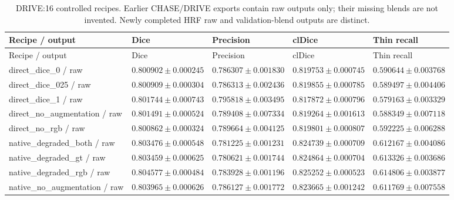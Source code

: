 \documentclass[jimaging,article,submit,pdftex,moreauthors]{Definitions/mdpi}
\begin{document}
\begingroup\scriptsize\setlength{\tabcolsep}{3pt}\renewcommand{\arraystretch}{1.12}\setlength{\LTleft}{-\extralength}\setlength{\LTright}{0pt plus1fill}\setlength{\LTcapwidth}{\dimexpr 15.000cm+24pt\relax}\captionsetup[longtable]{margin=0pt,width=\LTcapwidth,singlelinecheck=false,justification=raggedright}\makeatletter\long{}\makeatother
\begin{longtable}{@{}>{\raggedright\arraybackslash}p{5.0cm}>{\raggedright\arraybackslash}p{2.5cm}>{\raggedright\arraybackslash}p{2.5cm}>{\raggedright\arraybackslash}p{2.5cm}>{\raggedright\arraybackslash}p{2.5cm}@{}}
\caption{DRIVE:16 controlled recipes. Earlier CHASE/DRIVE exports contain raw outputs only; their missing blends are not invented. Newly completed HRF raw and validation-blend outputs are distinct.}\label{tab:controls-DRIVE}\\
\toprule
Recipe / output & Dice & Precision & clDice & Thin recall\\
\midrule\endfirsthead
\toprule
Recipe / output & Dice & Precision & clDice & Thin recall\\
\midrule\endhead
\bottomrule\endfoot
direct\_dice\_0 / raw & $0.800902\pm 0.000245$ & $0.786307\pm 0.001830$ & $0.819753\pm 0.000745$ & $0.590644\pm 0.003768$\\
direct\_dice\_025 / raw & $0.800909\pm 0.000304$ & $0.786313\pm 0.002436$ & $0.819855\pm 0.000785$ & $0.589497\pm 0.004406$\\
direct\_dice\_1 / raw & $0.801744\pm 0.000743$ & $0.795818\pm 0.003495$ & $0.817872\pm 0.000796$ & $0.579163\pm 0.003329$\\
direct\_no\_augmentation / raw & $0.801491\pm 0.000524$ & $0.789408\pm 0.007334$ & $0.819264\pm 0.001613$ & $0.588349\pm 0.007118$\\
direct\_no\_rgb / raw & $0.800862\pm 0.000324$ & $0.789664\pm 0.004125$ & $0.819801\pm 0.000807$ & $0.592225\pm 0.006288$\\
native\_degraded\_both / raw & $0.803476\pm 0.000548$ & $0.781225\pm 0.001231$ & $0.824739\pm 0.000709$ & $0.612167\pm 0.004086$\\
native\_degraded\_gt / raw & $0.803459\pm 0.000625$ & $0.780621\pm 0.001744$ & $0.824864\pm 0.000704$ & $0.613326\pm 0.003686$\\
native\_degraded\_rgb / raw & $0.804577\pm 0.000484$ & $0.783928\pm 0.001196$ & $0.825252\pm 0.000523$ & $0.614806\pm 0.003877$\\
native\_no\_augmentation / raw & $0.803965\pm 0.000626$ & $0.786127\pm 0.001772$ & $0.823665\pm 0.001242$ & $0.611769\pm 0.007558$\\

\end{longtable}
\end{document}
